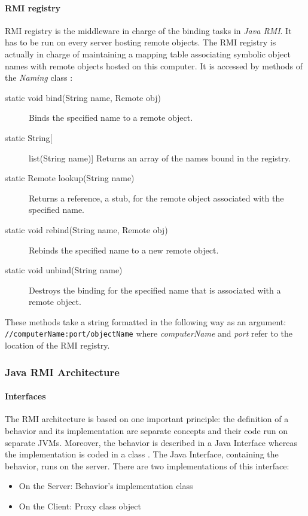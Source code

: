 \paragraph{RMI registry}
RMI registry is the middleware in charge of the binding tasks in \textit{Java RMI}. It has to be run on every server hosting remote objects. The RMI registry is actually in charge of maintaining a mapping table associating symbolic object names with remote objects hosted on this computer. It is accessed by methods of the \textit{Naming} class :
\begin{description}
\item[static void 	bind(String name, Remote obj)]
    Binds the specified name to a remote object.
\item[static String[] 	list(String name)]
    Returns an array of the names bound in the registry.
\item[static Remote 	lookup(String name)]
    Returns a reference, a stub, for the remote object associated with the specified name.
\item[static void 	rebind(String name, Remote obj)]
    Rebinds the specified name to a new remote object.
\item[static void 	unbind(String name)]
    Destroys the binding for the specified name that is associated with a remote object.
\end{description}
These methods take a string formatted in the following way as an argument:
\verb|//computerName:port/objectName|
where \textit{computerName} and \textit{port} refer to the location of the RMI registry.
\cite{DS-book}

\subsubsection{Java RMI Architecture} 
\label{JavaRMIArchitecture}

\paragraph{Interfaces}
\label{JavaRMIinterfaces}
The RMI architecture is based on one important principle: the definition of a behavior and its implementation are separate concepts and their code run on separate JVMs. Moreover, the behavior is described in a Java Interface whereas the implementation is coded in a class \cite{RMI-art5}.
The Java Interface, containing the behavior, runs on the server. There are two implementations of this interface:
\begin{itemize}
	\item On the Server: Behavior's implementation class
	\item On the Client: Proxy class object
\end{itemize}

